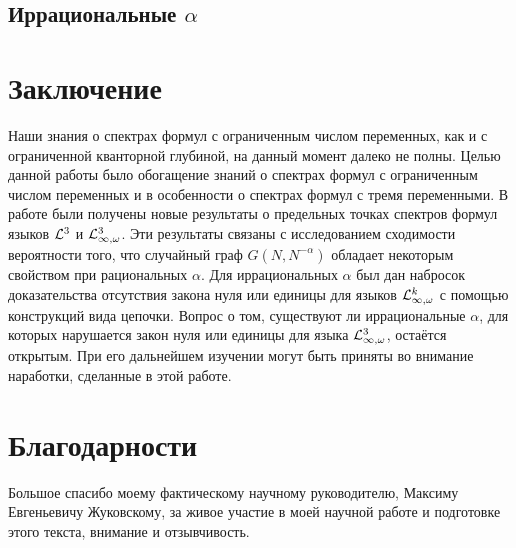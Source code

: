 \documentclass{mipt-thesis-bs}
\begin{document}
\subsection{Иррациональные \texorpdfstring{$\alpha$}{alpha}}

\newpage

\section{Заключение}
Наши знания о спектрах формул с ограниченным числом переменных, как и с ограниченной кванторной глубиной, на данный момент далеко не полны.
Целью данной работы было обогащение знаний о спектрах формул с ограниченным числом переменных и в особенности о спектрах формул с тремя переменными.
В работе были получены новые результаты о предельных точках спектров формул языков $\mathcal{L}^3$ и $\mathcal{L}^3_{\infty, \omega}$.
Эти результаты связаны с исследованием сходимости вероятности того, что случайный граф $G(N, N^{-\alpha})$ обладает некоторым свойством при рациональных $\alpha$.
Для иррациональных $\alpha$ был дан набросок доказательства отсутствия закона нуля или единицы для языков $\mathcal{L}^k_{\infty, \omega}$ с помощью конструкций вида цепочки.
Вопрос о том, существуют ли иррациональные $\alpha$, для которых нарушается закон нуля или единицы для языка $\mathcal{L}^3_{\infty, \omega}$, остаётся открытым.
При его дальнейшем изучении могут быть приняты во внимание наработки, сделанные в этой работе.
\newpage

\section{Благодарности}
Большое спасибо моему фактическому научному руководителю, Максиму Евгеньевичу Жуковскому, за живое участие в моей научной работе и подготовке этого текста, внимание и отзывчивость.


\end{document}
